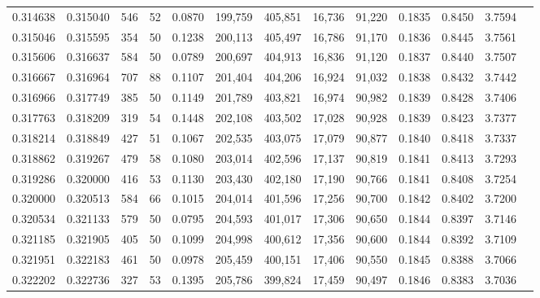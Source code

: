 \begin{tabular}{rrrrrrrrrrrrr}
0.314638 & 0.315040 &    546 &    52 &                                     0.0870 & 199,759 & 405,851 &  16,736 &  91,220 & 0.1835 & 0.8450 & 3.7594 \\
0.315046 & 0.315595 &    354 &    50 &                                     0.1238 & 200,113 & 405,497 &  16,786 &  91,170 & 0.1836 & 0.8445 & 3.7561 \\
0.315606 & 0.316637 &    584 &    50 &                                     0.0789 & 200,697 & 404,913 &  16,836 &  91,120 & 0.1837 & 0.8440 & 3.7507 \\
0.316667 & 0.316964 &    707 &    88 &                                     0.1107 & 201,404 & 404,206 &  16,924 &  91,032 & 0.1838 & 0.8432 & 3.7442 \\
0.316966 & 0.317749 &    385 &    50 &                                     0.1149 & 201,789 & 403,821 &  16,974 &  90,982 & 0.1839 & 0.8428 & 3.7406 \\
0.317763 & 0.318209 &    319 &    54 &                                     0.1448 & 202,108 & 403,502 &  17,028 &  90,928 & 0.1839 & 0.8423 & 3.7377 \\
0.318214 & 0.318849 &    427 &    51 &                                     0.1067 & 202,535 & 403,075 &  17,079 &  90,877 & 0.1840 & 0.8418 & 3.7337 \\
0.318862 & 0.319267 &    479 &    58 &                                     0.1080 & 203,014 & 402,596 &  17,137 &  90,819 & 0.1841 & 0.8413 & 3.7293 \\
0.319286 & 0.320000 &    416 &    53 &                                     0.1130 & 203,430 & 402,180 &  17,190 &  90,766 & 0.1841 & 0.8408 & 3.7254 \\
0.320000 & 0.320513 &    584 &    66 &                                     0.1015 & 204,014 & 401,596 &  17,256 &  90,700 & 0.1842 & 0.8402 & 3.7200 \\
0.320534 & 0.321133 &    579 &    50 &                                     0.0795 & 204,593 & 401,017 &  17,306 &  90,650 & 0.1844 & 0.8397 & 3.7146 \\
0.321185 & 0.321905 &    405 &    50 &                                     0.1099 & 204,998 & 400,612 &  17,356 &  90,600 & 0.1844 & 0.8392 & 3.7109 \\
0.321951 & 0.322183 &    461 &    50 &                                     0.0978 & 205,459 & 400,151 &  17,406 &  90,550 & 0.1845 & 0.8388 & 3.7066 \\
0.322202 & 0.322736 &    327 &    53 &                                     0.1395 & 205,786 & 399,824 &  17,459 &  90,497 & 0.1846 & 0.8383 & 3.7036 \\

\end{tabular}
